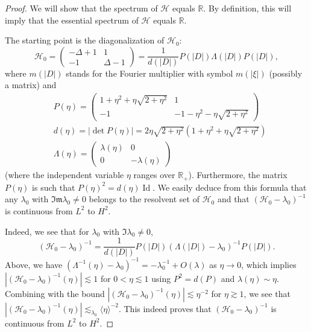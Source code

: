 \documentclass[11 pt]{amsart}
\theoremstyle{definition}
\theoremstyle{remark}
\numberwithin{equation}{section}
\begin{document}
\begin{proof}

We will show that the spectrum of $\mathcal H$ equals $\mathbb R$. By definition, this will imply that the essential spectrum of $\mathcal H$ equals $\mathbb R$.

The starting point is the diagonalization of $\mathcal{H}_0$:
$$
\mathcal{H}_0 = \begin{pmatrix} -\Delta + 1 & 1 \\ -1 & \Delta - 1 \end{pmatrix} = \frac{1}{d(|D|)} P(|D|) \Lambda(|D|) P(|D|),
$$
where $m(|D|)$ stands for the Fourier multiplier with symbol $m(|\xi|)$ (possibly a matrix) and
\begin{align*}
& P(\eta) = \begin{pmatrix} 1 + \eta^2 + \eta \sqrt{2 + \eta^2} & 1 \\ -1 & -1 - \eta^2 - \eta \sqrt{2 + \eta^2}\end{pmatrix}\\
& d(\eta) = | \det P(\eta)| = 2 \eta  \sqrt{2 + \eta^2} ( 1 + \eta^2 + \eta \sqrt{2+\eta^2}) \\
& \Lambda(\eta) = \begin{pmatrix} \lambda(\eta) & 0 \\ 0 & - \lambda(\eta) \end{pmatrix}
\end{align*}
(where the independent variable $\eta$ ranges over $\mathbb{R}_+$).
Furthermore, the matrix $P(\eta)$ is such that $P(\eta)^2 = d(\eta) \operatorname{Id}$. We easily deduce from this formula that any $\lambda_0$ with $\mathfrak{Im} \lambda_0\neq 0$ belongs to the resolvent set of $\mathcal H_0$ and that $(\mathcal H_0-\lambda_0)^{-1}$ is continuous from $L^2$ to $H^2$.

Indeed, we see that for $\lambda_0$ with $\Im \lambda_0 \neq 0$, 
$$
(\mathcal H_0-\lambda_0)^{-1}=\frac{1}{d(|D|)} P(|D|) (\Lambda(|D|)-\lambda_0)^{-1} P(|D|).
$$
Above, we have $(\Lambda^{-1}(\eta)-\lambda_0)^{-1}=-\lambda_0^{-1}+O(\lambda)$ as $\eta\to 0$, which implies $|(\mathcal H_0-\lambda_0)^{-1}(\eta)|\lesssim 1$ for $0<\eta\lesssim 1$ using $P^2=d(P)$ and $\lambda(\eta)\sim \eta$. Combining with the bound $|(\mathcal H_0-\lambda_0)^{-1}(\eta)|\lesssim \eta^{-2}$ for $\eta\gtrsim 1$, we see that $|(\mathcal H_0-\lambda_0)^{-1}(\eta)|\lesssim_{\lambda_0} \langle \eta\rangle^{-2}$. This indeed proves that $(\mathcal H_0-\lambda_0)^{-1}$ is continuous from $L^2$ to $H^2$.


\end{proof}
\end{document}
